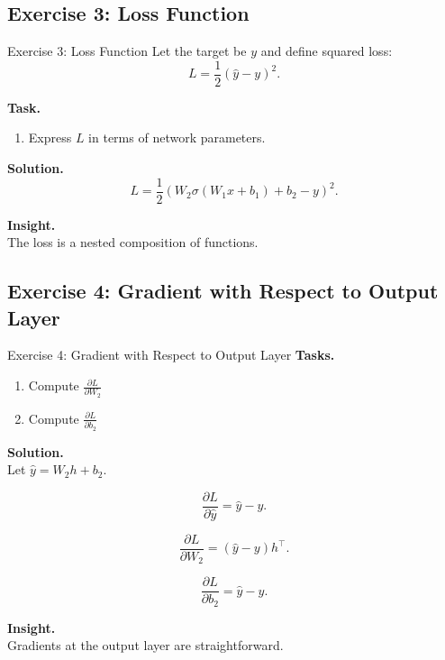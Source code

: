 \documentclass[aspectratio=169,11pt]{beamer}
\begin{document}
\subsection{Exercise 3: Loss Function}
\begin{frame}[t,allowframebreaks]{Exercise 3: Loss Function}
\small
Let the target be $y$ and define squared loss:
\[
L = \frac{1}{2} (\hat{y} - y)^2.
\]

\textbf{Task.}\\ \begin{enumerate}
    \item Express $L$ in terms of network parameters.
\end{enumerate}

\textbf{Solution.}\\ \[
L = \frac{1}{2} \left(W_2 \sigma(W_1 x + b_1) + b_2 - y\right)^2.
\]

\textbf{Insight.}\\ The loss is a nested composition of functions.
\end{frame}

\subsection{Exercise 4: Gradient with Respect to Output Layer}
\begin{frame}[t,allowframebreaks]{Exercise 4: Gradient with Respect to Output Layer}
\small
\textbf{Tasks.}\\ \begin{enumerate}
    \item Compute $\frac{\partial L}{\partial W_2}$
    \item Compute $\frac{\partial L}{\partial b_2}$
\end{enumerate}

\textbf{Solution.}\\ Let $\hat{y} = W_2 h + b_2$.

\[
\frac{\partial L}{\partial \hat{y}} = \hat{y} - y.
\]

\[
\frac{\partial L}{\partial W_2} = (\hat{y} - y) h^\top.
\]

\[
\frac{\partial L}{\partial b_2} = \hat{y} - y.
\]

\textbf{Insight.}\\ Gradients at the output layer are straightforward.
\end{frame}
\end{document}
